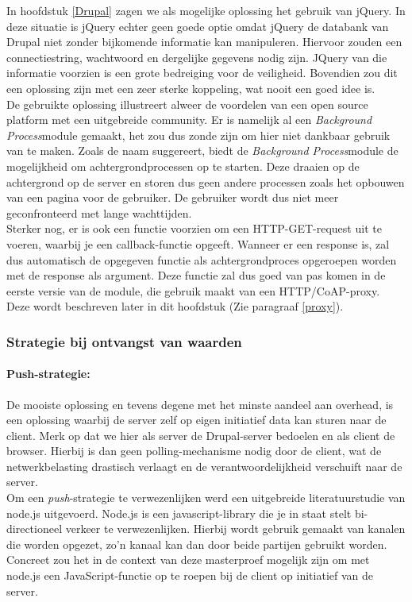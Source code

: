 In hoofdstuk \ref{Drupal} zagen we als mogelijke oplossing het gebruik van jQuery. In deze situatie is jQuery echter geen goede optie omdat jQuery de databank van Drupal niet zonder bijkomende informatie kan manipuleren. Hiervoor zouden een connectiestring, wachtwoord en dergelijke gegevens nodig zijn. JQuery van die informatie voorzien is een grote bedreiging voor de veiligheid. Bovendien zou dit een oplossing zijn met een zeer sterke koppeling, wat nooit een goed idee is.\\
De gebruikte oplossing illustreert alweer de voordelen van een open source platform met een uitgebreide community. Er is namelijk al een \textit{Background Process}module gemaakt, het zou dus zonde zijn om hier niet dankbaar gebruik van te maken. Zoals de naam suggereert, biedt de \textit{Background Process}module de mogelijkheid om achtergrondprocessen op te starten. Deze draaien op de achtergrond op de server en storen dus geen andere processen zoals het opbouwen van een pagina voor de gebruiker. De gebruiker wordt dus niet meer geconfronteerd met lange wachttijden.\\
Sterker nog, er is ook een functie voorzien om een HTTP-GET-request uit te voeren, waarbij je een callback-functie opgeeft. Wanneer er een response is, zal dus automatisch de opgegeven functie als achtergrondproces opgeroepen worden met de response als argument. Deze functie zal dus goed van pas komen in de eerste versie van de module, die gebruik maakt van een HTTP/CoAP-proxy. Deze wordt beschreven later in dit hoofdstuk (Zie paragraaf \ref{proxy}).

\subsubsection{Strategie bij ontvangst van waarden}
\paragraph{Push-strategie:}

De mooiste oplossing en tevens degene met het minste aandeel aan overhead, is een oplossing waarbij de server zelf op eigen initiatief data kan sturen naar de client. Merk op dat we hier als server de Drupal-server bedoelen en als client de browser. Hierbij is dan geen polling-mechanisme nodig door de client, wat de netwerkbelasting drastisch verlaagt en de verantwoordelijkheid verschuift naar de server.\\
Om een \textit{push}-strategie te verwezenlijken werd een uitgebreide literatuurstudie van node.js uitgevoerd. Node.js is een javascript-library die je in staat stelt bi-directioneel verkeer te verwezenlijken. Hierbij wordt gebruik gemaakt van kanalen die worden opgezet, zo'n kanaal kan dan door beide partijen gebruikt worden.\\
Concreet zou het in de context van deze masterproef mogelijk zijn om met node.js een JavaScript-functie op te roepen bij de client op initiatief van de server.\\

